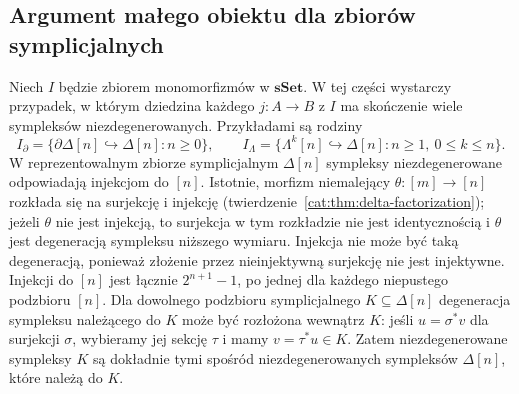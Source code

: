 \subsection{Argument małego obiektu dla zbiorów symplicjalnych}

Niech $I$ będzie zbiorem monomorfizmów w $\mathbf{sSet}$. W tej części wystarczy przypadek, w którym dziedzina każdego $j:A\to B$ z $I$ ma skończenie wiele sympleksów niezdegenerowanych. Przykładami są rodziny
\[
 I_{\partial}=\{\partial\Delta[n]\hookrightarrow\Delta[n]:n\geq0\},
 \qquad
 I_{\Lambda}=\{\Lambda^k[n]\hookrightarrow\Delta[n]:n\geq1,\ 0\leq k\leq n\}.
\]
W reprezentowalnym zbiorze symplicjalnym $\Delta[n]$ sympleksy niezdegenerowane odpowiadają injekcjom do $[n]$. Istotnie, morfizm niemalejący $\theta:[m]\to[n]$ rozkłada się na surjekcję i injekcję (twierdzenie~\ref{cat:thm:delta-factorization}); jeżeli $\theta$ nie jest injekcją, to surjekcja w tym rozkładzie nie jest identycznością i $\theta$ jest degeneracją sympleksu niższego wymiaru. Injekcja nie może być taką degeneracją, ponieważ złożenie przez nieinjektywną surjekcję nie jest injektywne. Injekcji do $[n]$ jest łącznie $2^{n+1}-1$, po jednej dla każdego niepustego podzbioru $[n]$. Dla dowolnego podzbioru symplicjalnego $K\subseteq\Delta[n]$ degeneracja sympleksu należącego do $K$ może być rozłożona wewnątrz $K$: jeśli $u=\sigma^*v$ dla surjekcji $\sigma$, wybieramy jej sekcję $\tau$ i mamy $v=\tau^*u\in K$. Zatem niezdegenerowane sympleksy $K$ są dokładnie tymi spośród niezdegenerowanych sympleksów $\Delta[n]$, które należą do $K$.

